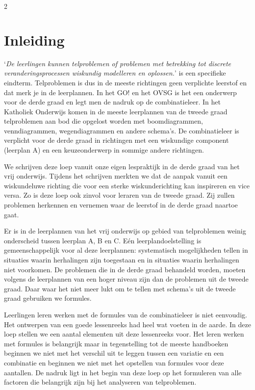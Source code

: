 \begin{multicols}{2}                      
\inhoudstafelLoep		                  %




\section{Inleiding}

`\emph {De leerlingen kunnen telproblemen of problemen met betrekking tot discrete veranderingsprocessen wiskundig modelleren en oplossen.}' is een specifieke eindterm. Telproblemen is dus in de meeste richtingen geen verplichte leerstof en dat merk je in de leerplannen. In het GO! en het OVSG is het een onderwerp voor de derde graad en legt men de nadruk op de combinatieleer. In het Katholiek Onderwijs komen in de meeste leerplannen van de tweede graad telproblemen aan bod die opgelost worden met boomdiagrammen, venndiagrammen, wegendiagrammen en andere schema's. De combinatieleer is verplicht  voor de derde graad in richtingen met een wiskundige component (leerplan A) en een keuzeonderwerp in sommige andere richtingen.

We schrijven deze loep vanuit onze eigen lespraktijk in de derde graad van het vrij onderwijs. Tijdens het schrijven merkten we dat de aanpak vanuit een wiskundeluwe richting die voor een sterke wiskunderichting kan inspireren en vice versa. Zo is deze loep ook zinvol voor leraren van de tweede graad. Zij zullen problemen herkennen en vernemen waar de leerstof in de derde graad naartoe gaat.

Er is in de leerplannen van het vrij onderwijs op gebied van telproblemen weinig onderscheid tussen leerplan A, B en C. Eén leerplandoelstelling is gemeenschappelijk voor al deze leerplannen: systematisch mogelijkheden tellen in situaties waarin herhalingen zijn toegestaan en in situaties waarin herhalingen niet voorkomen. De problemen die in de derde graad behandeld worden, moeten volgens de leerplannen van een hoger niveau zijn dan de problemen uit de tweede graad. Daar waar het niet meer lukt om te tellen met schema's uit de tweede graad gebruiken we formules.

Leerlingen leren werken met de formules van de combinatieleer is niet eenvoudig. Het ontwerpen van een goede lessenreeks had heel wat voeten in de aarde. In deze loep stellen we een aantal elementen uit deze lessenreeks voor. Het leren werken met formules is belangrijk maar in tegenstelling tot de meeste handboeken beginnen we niet met het verschil uit te leggen tussen een variatie en een combinatie en beginnen we niet met het opstellen van formules voor deze aantallen. De nadruk ligt in het begin van deze loep op het formuleren van alle factoren die belangrijk zijn bij het analyseren van telproblemen. 


\end{multicols}
